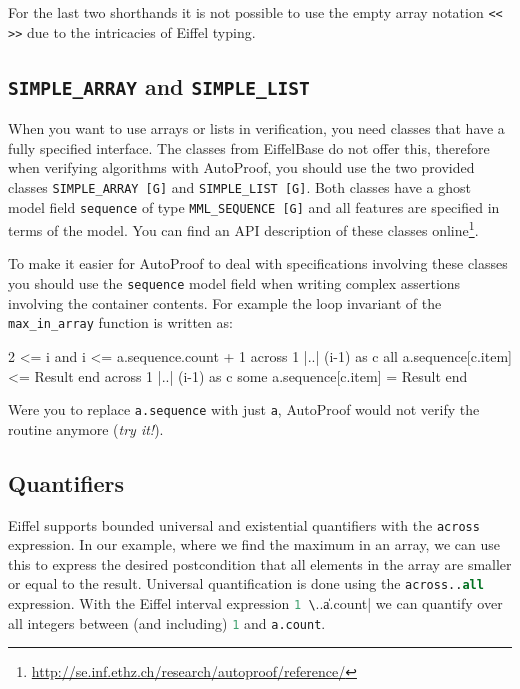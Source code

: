 \documentclass[a4paper,12pt]{article}
\newcommand{\AutoProof}{Auto\-Proof\xspace}
\newcommand{\e}[1]{\mbox{\lstinline[language=Eiffel]|#1|}}
\begin{document}
For the last two shorthands it is not possible to use the empty array notation \e{<< >>} due to the intricacies of Eiffel typing.

\subsection{\e{SIMPLE_ARRAY} and \e{SIMPLE_LIST}}

When you want to use arrays or lists in verification, you need classes that have a fully specified interface. The classes from EiffelBase do not offer this, therefore when verifying algorithms with \AutoProof, you should use the two provided classes \e{SIMPLE_ARRAY [G]} and \e{SIMPLE_LIST [G]}. Both classes have a ghost model field \e{sequence} of type \e{MML_SEQUENCE [G]} and all features are specified in terms of the model. You can find an API description of these classes online\footnote{\url{http://se.inf.ethz.ch/research/autoproof/reference/}}.

To make it easier for \AutoProof to deal with specifications involving these classes you should use the \e{sequence} model field when writing complex assertions involving the container contents. For example the loop invariant of the \e{max_in_array} function is written as:
\begin{erunning}
2 <= i and i <= a.sequence.count + 1
across 1 |..| (i-1) as c all a.sequence[c.item] <= Result end
across 1 |..| (i-1) as c some a.sequence[c.item] = Result end
\end{erunning}
Were you to replace \e{a.sequence} with just \e{a}, \AutoProof would not verify the routine anymore (\emph{try it!}).

\subsection{Quantifiers}

Eiffel supports bounded universal and existential quantifiers with the \e{across} expression. In our example, where we find the maximum in an array, we can use this to express the desired postcondition that all elements in the array are smaller or equal to the result. Universal quantification is done using the \e{across..all} expression. With the Eiffel interval expression \e{1 \|..\| a.count} we can quantify over all integers between (and including) \e{1} and \e{a.count}. 
\end{document}
